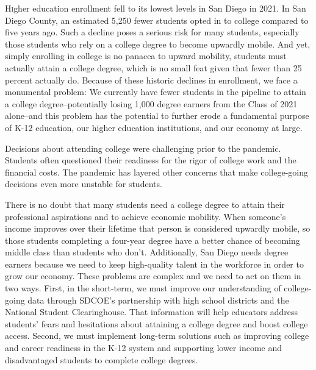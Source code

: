 \documentclass[
  11pt,
]{article}
\author{}
\date{\vspace{-2.5em}}
\begin{document}
\raggedright

\sdcoelogo{}

\vspace{20mm}

\vspace{5mm}

\lettrine[lines=3, lraise=0.2, nindent=0em, slope=0em]{H}igher education
enrollment fell to its lowest levels in San Diego in 2021. In San Diego
County, an estimated 5,250 fewer students opted in to college compared
to five years ago. Such a decline poses a serious risk for many
students, especially those students who rely on a college degree to
become upwardly mobile. And yet, simply enrolling in college is no
panacea to upward mobility, students must actually attain a college
degree, which is no small feat given that fewer than 25 percent actually
do. Because of these historic declines in enrollment, we face a
monumental problem: We currently have fewer students in the pipeline to
attain a college degree--potentially losing 1,000 degree earners from
the Class of 2021 alone--and this problem has the potential to further
erode a fundamental purpose of K-12 education, our higher education
institutions, and our economy at large.

Decisions about attending college were challenging prior to the
pandemic. Students often questioned their readiness for the rigor of
college work and the financial costs. The pandemic has layered other
concerns that make college-going decisions even more unstable for
students.

There is no doubt that many students need a college degree to attain
their professional aspirations and to achieve economic mobility. When
someone's income improves over their lifetime that person is considered
upwardly mobile, so those students completing a four-year degree have a
better chance of becoming middle class than students who don't.
Additionally, San Diego needs degree earners because we need to keep
high-quality talent in the workforce in order to grow our economy. These
problems are complex and we need to act on them in two ways. First, in
the short-term, we must improve our understanding of college-going data
through SDCOE's partnership with high school districts and the National
Student Clearinghouse. That information will help educators address
students' fears and hesitations about attaining a college degree and
boost college access. Second, we must implement long-term solutions such
as improving college and career readiness in the K-12 system and
supporting lower income and disadvantaged students to complete college
degrees.
\end{document}
